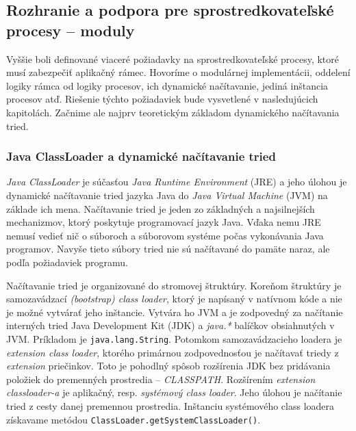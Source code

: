 
\subsection{Rozhranie a podpora pre sprostredkovateľské procesy -- moduly} \label{sec:intermediate_process}

Vyššie boli definované viaceré požiadavky na sprostredkovateľské procesy, ktoré musí zabezpečiť 
aplikačný rámec. Hovoríme o modulárnej implementácii, oddelení logiky rámca od logiky procesov, 
ich dynamické načítavanie, jediná inštancia procesov atď. Riešenie týchto požiadaviek bude vysvetlené v 
nasledujúcich kapitolách. Začnime ale najprv teoretickým základom dynamického načítavania tried.

\subsubsection{Java ClassLoader a dynamické načítavanie tried} \label{sec:classLoader}

\emph{Java ClassLoader} je súčasťou \emph{Java Runtime Environment} (JRE) a jeho úlohou je dynamické
načítavanie tried jazyka Java do \emph{Java Virtual Machine} (JVM) na základe ich mena. 
Načítavanie tried je jeden zo základných a najsilnejších mechanizmov, ktorý poskytuje programovací jazyk
Java. Vďaka nemu JRE nemusí vedieť nič o súboroch a súborovom systéme počas vykonávania Java programov. 
Navyše tieto súbory tried nie sú načítavané do pamäte naraz, ale podľa požiadaviek 
programu. \citep{mcmanis, travis}

Načítavanie tried je organizované do stromovej štruktúry. Koreňom štruktúry je samozavádzací 
\emph{(bootstrap) class loader}, ktorý je napísaný v natívnom kóde a nie je možné vytvárať jeho inštancie. 
Vytvára ho 
JVM a je zodpovedný za načítanie interných tried Java Development Kit (JDK) a \emph{java.*} balíčkov 
obsiahnutých v JVM. Príkladom je \verb|java.lang.String|. Potomkom samozavádzacieho loadera je 
\emph{extension class loader},
ktorého primárnou zodpovednosťou je načítavať triedy z \emph{extension} priečinkov. Toto je pohodlný 
spôsob rozšírenia JDK bez pridávania položiek do premenných prostredia -- \emph{CLASSPATH}. 
Rozšírením \emph{extension classloader-a} je aplikačný, resp. \emph{systémový class loader}. Jeho úlohou 
je načítanie tried z cesty danej premennou prostredia. Inštanciu systémového class loadera získavame 
metódou \verb|ClassLoader.getSystemClassLoader()|. \citep{techjava, antl}

